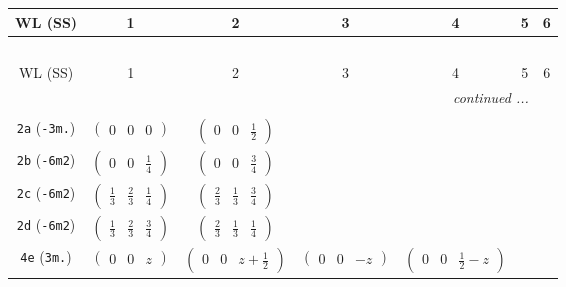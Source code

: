 \documentclass[fleqn,9pt,landscape]{jsarticle}
\begin{document}
\begin{center}
\renewcommand{\arraystretch}{1.2}
\begin{longtable}{ccccccc}
 \hline \hline
WL (SS) & 1 & 2 & 3 & 4 & 5 & 6 \\ \hline \endfirsthead

\multicolumn{6}{l}{\tablename\ \thetable{}} \\
 \hline \hline
WL (SS) & 1 & 2 & 3 & 4 & 5 & 6 \\ \hline \endhead

 \hline \hline
\multicolumn{6}{r}{\footnotesize\it continued ...} \\ \endfoot

 \hline \hline
\multicolumn{6}{r}{} \\ \endlastfoot

{\tt 2a} ({\tt -3m.}) & $ \begin{pmatrix} 0 & 0 & 0 \end{pmatrix} $ & $ \begin{pmatrix} 0 & 0 & \frac{1}{2} \end{pmatrix} $ & $  $ & $  $ & $  $ & $  $ \\ \hline
{\tt 2b} ({\tt -6m2}) & $ \begin{pmatrix} 0 & 0 & \frac{1}{4} \end{pmatrix} $ & $ \begin{pmatrix} 0 & 0 & \frac{3}{4} \end{pmatrix} $ & $  $ & $  $ & $  $ & $  $ \\ \hline
{\tt 2c} ({\tt -6m2}) & $ \begin{pmatrix} \frac{1}{3} & \frac{2}{3} & \frac{1}{4} \end{pmatrix} $ & $ \begin{pmatrix} \frac{2}{3} & \frac{1}{3} & \frac{3}{4} \end{pmatrix} $ & $  $ & $  $ & $  $ & $  $ \\ \hline
{\tt 2d} ({\tt -6m2}) & $ \begin{pmatrix} \frac{1}{3} & \frac{2}{3} & \frac{3}{4} \end{pmatrix} $ & $ \begin{pmatrix} \frac{2}{3} & \frac{1}{3} & \frac{1}{4} \end{pmatrix} $ & $  $ & $  $ & $  $ & $  $ \\ \hline
{\tt 4e} ({\tt 3m.}) & $ \begin{pmatrix} 0 & 0 & z \end{pmatrix} $ & $ \begin{pmatrix} 0 & 0 & z + \frac{1}{2} \end{pmatrix} $ & $ \begin{pmatrix} 0 & 0 & - z \end{pmatrix} $ & $ \begin{pmatrix} 0 & 0 & \frac{1}{2} - z \end{pmatrix} $ & $  $ & $  $ \\ \hline

\end{longtable}
\end{center}
\end{document}
